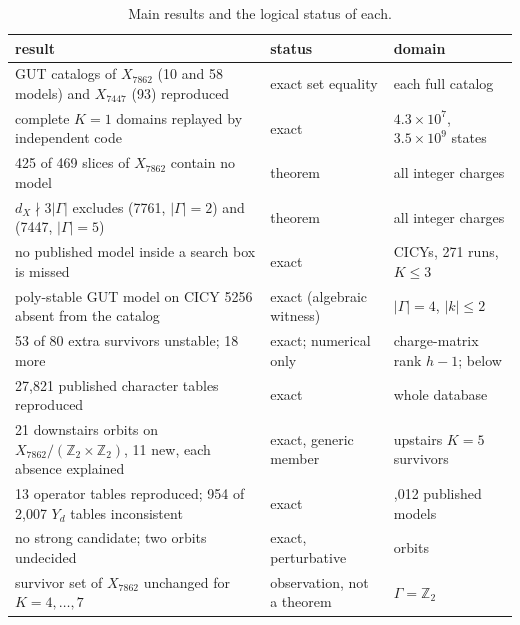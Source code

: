 \documentclass[10pt,a4paper]{article}
\newcommand{\Z}{\mathbb{Z}}
\newcommand{\Xa}{X_{7862}}
\newcommand{\Xb}{X_{7447}}
\begin{document}
\begin{table}[h]
\centering\small
\setlength{\tabcolsep}{5pt}
\renewcommand{\arraystretch}{1.05}
\begin{tabularx}{\textwidth}{@{}X>{\raggedright}p{3.6cm}>{\raggedright\arraybackslash}p{4.1cm}@{}}
\toprule
result & status & domain \\
\midrule
GUT catalogs of $\Xa$ (10 and 58 models) and $\Xb$ (93) reproduced & exact set equality & each full catalog \\
complete $K=1$ domains replayed by independent code & exact & $4.3\times10^7$, $3.5\times10^9$ states \\
425 of 469 slices of $\Xa$ contain no model & theorem & all integer charges \\
$d_X\nmid3|\Gamma|$ excludes (7761, $|\Gamma|=2$) and (7447, $|\Gamma|=5$) & theorem & all integer charges \\
no published model inside a search box is missed & exact & 68 CICYs, 271 runs, $K\le3$ \\
poly-stable GUT model on CICY 5256 absent from the catalog & exact (algebraic witness) & $|\Gamma|=4$, $|k|\le2$ \\
53 of 80 extra survivors unstable; 18 more & exact; numerical only & charge-matrix rank $h-1$; below \\
27,821 published character tables reproduced & exact & whole database \\
21 downstairs orbits on $\Xa/(\Z_2\times\Z_2)$, 11 new, each absence explained & exact, generic member & upstairs $K=5$ survivors \\
13 operator tables reproduced; 954 of 2,007 $Y_d$ tables inconsistent & exact & 2,012 published models \\
no strong candidate; two orbits undecided & exact, perturbative & 21 orbits \\
survivor set of $\Xa$ unchanged for $K=4,\dots,7$ & observation, not a theorem & $\Gamma=\Z_2$ \\
\bottomrule
\end{tabularx}
\caption{Main results and the logical status of each.}
\label{tab:results}
\end{table}

\vspace{-6pt}
\end{document}
